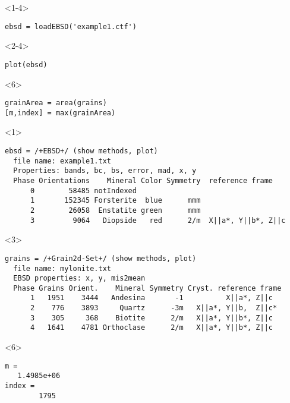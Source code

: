 \documentclass[compress]{beamer}
\begin{document}
\begin{frame}[fragile]
  \begin{onlyenv}<1-4>
    \begin{lstlisting}[style=input]
ebsd = loadEBSD('example1.ctf')
    \end{lstlisting}
  \end{onlyenv}
  \begin{onlyenv}<2-4>
      \vspace{-0.4cm}
      \begin{lstlisting}[style=input]
plot(ebsd)
    \end{lstlisting}
    \end{onlyenv}
    \begin{onlyenv}<6>
      \vspace{-0.4cm}
      \begin{lstlisting}[style=input]
grainArea = area(grains)
[m,index] = max(grainArea)
    \end{lstlisting}
    \end{onlyenv}
\begin{onlyenv}<1>
\begin{lstlisting}[style=output]
ebsd = /+EBSD+/ (show methods, plot)
  file name: example1.txt
  Properties: bands, bc, bs, error, mad, x, y
  Phase Orientations    Mineral Color Symmetry  reference frame
      0        58485 notIndexed
      1       152345 Forsterite  blue      mmm
      2        26058  Enstatite green      mmm
      3         9064   Diopside   red      2/m  X||a*, Y||b*, Z||c
  \end{lstlisting}
    \end{onlyenv}
\begin{onlyenv}<3>
\begin{lstlisting}[style=output]
grains = /+Grain2d-Set+/ (show methods, plot)
  file name: mylonite.txt
  EBSD properties: x, y, mis2mean
  Phase Grains Orient.    Mineral Symmetry Cryst. reference frame
      1   1951    3444   Andesina       -1          X||a*, Z||c
      2    776    3893     Quartz      -3m   X||a*, Y||b,  Z||c*
      3    305     368    Biotite      2/m   X||a*, Y||b*, Z||c
      4   1641    4781 Orthoclase      2/m   X||a*, Y||b*, Z||c
  \end{lstlisting}
\end{onlyenv}
\begin{onlyenv}<6>
\begin{lstlisting}[style=output]
m =
   1.4985e+06
index =
        1795
\end{lstlisting}
\end{onlyenv}
\end{frame}
\end{document}
